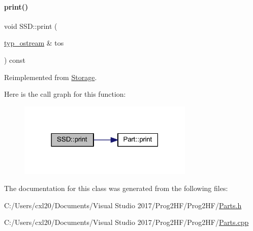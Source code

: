 \paragraph{\texorpdfstring{print()}{print()}\hspace{0.1cm}{\footnotesize\ttfamily [4/4]}}
{\footnotesize\ttfamily void S\+S\+D\+::print (\begin{DoxyParamCaption}\item[{\mbox{\hyperlink{structtyp__ostream}{typ\+\_\+ostream}} \&}]{tos }\end{DoxyParamCaption}) const\hspace{0.3cm}{\ttfamily [virtual]}}



Reimplemented from \mbox{\hyperlink{class_storage_ad6c13f251a39612a7628980bf2f12918}{Storage}}.

Here is the call graph for this function\+:
\nopagebreak
\begin{figure}[H]
\begin{center}
\leavevmode
\includegraphics[width=237pt]{class_s_s_d_a6e252152f8ba75043edec67e19d686e0_cgraph}
\end{center}
\end{figure}


The documentation for this class was generated from the following files\+:\begin{DoxyCompactItemize}
\item 
C\+:/\+Users/cxl20/\+Documents/\+Visual Studio 2017/\+Prog2\+H\+F/\+Prog2\+H\+F/\mbox{\hyperlink{_parts_8h}{Parts.\+h}}\item 
C\+:/\+Users/cxl20/\+Documents/\+Visual Studio 2017/\+Prog2\+H\+F/\+Prog2\+H\+F/\mbox{\hyperlink{_parts_8cpp}{Parts.\+cpp}}\end{DoxyCompactItemize}
